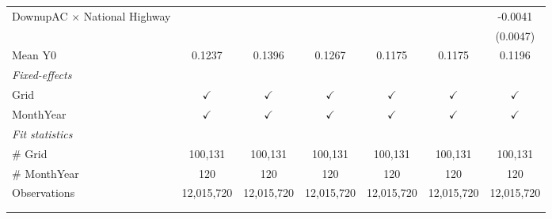 \begin{table}[htbp]
\begin{tabular}{lcccccc}
      DownupAC $\times$ National Highway                         &               &               &               &               &               & -0.0041\\   
                                                                 &               &               &               &               &               & (0.0047)\\   
      \hline Mean Y0                                             & 0.1237        & 0.1396        & 0.1267        & 0.1175        & 0.1175        & 0.1196\\  
      \midrule
      \emph{Fixed-effects}\\
      Grid                                                       & $\checkmark$  & $\checkmark$  & $\checkmark$  & $\checkmark$  & $\checkmark$  & $\checkmark$\\   
      MonthYear                                                  & $\checkmark$  & $\checkmark$  & $\checkmark$  & $\checkmark$  & $\checkmark$  & $\checkmark$\\   
      \midrule
      \emph{Fit statistics}\\
      \# Grid                                                    & 100,131       & 100,131       & 100,131       & 100,131       & 100,131       & 100,131\\  
      \# MonthYear                                               & 120           & 120           & 120           & 120           & 120           & 120\\  
      Observations                                               & 12,015,720    & 12,015,720    & 12,015,720    & 12,015,720    & 12,015,720    & 12,015,720\\  
      \midrule \midrule
                                                                 &               &               &               &               &               &  \tabularnewline 
      \\
   \end{tabular}
\end{table}


